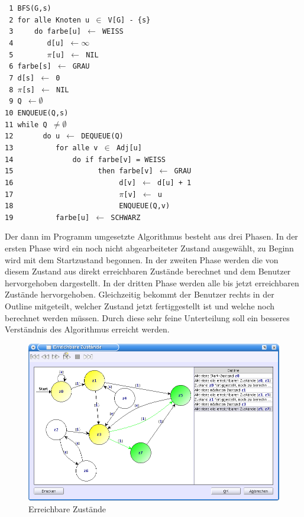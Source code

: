 \noindent
\verb| 1 BFS(G,s)|\\
\verb| 2 for alle Knoten u |$\in$\verb| V[G] - {s}|\\
\verb| 3     do farbe[u] |$\gets$\verb| WEISS|\\
\verb| 4        d[u] |$\gets \infty$\\
\verb| 5        |$\pi$\verb|[u] |$\gets$\verb| NIL|\\
\verb| 6 farbe[s] |$\gets$\verb| GRAU|\\
\verb| 7 d[s] |$\gets$\verb| 0|\\
\verb| 8 |$\pi$\verb|[s] |$\gets$\verb| NIL|\\
\verb| 9 Q |$\gets \emptyset$\\
\verb|10 ENQUEUE(Q,s)|\\
\verb|11 while Q |$\neq \emptyset$\\
\verb|12       do u |$\gets$\verb| DEQUEUE(Q)|\\
\verb|13          for alle v |$\in$\verb| Adj[u]|\\
\verb|14              do if farbe[v] = WEISS|\\
\verb|15                    then farbe[v] |$\gets$\verb| GRAU|\\
\verb|16                         d[v] |$\gets$\verb| d[u] + 1|\\
\verb|17                         |$\pi$\verb|[v] |$\gets$\verb| u|\\
\verb|18                         ENQUEUE(Q,v)|\\
\verb|19          farbe[u] |$\gets$\verb| SCHWARZ|\\
\vspace{10pt}

Der dann im Programm umgesetzte Algorithmus besteht aus drei Phasen. In der
ersten Phase wird ein noch nicht abgearbeiteter Zustand ausgewählt, zu Beginn
wird mit dem Startzustand begonnen. In der zweiten Phase werden die von diesem
Zustand aus direkt erreichbaren Zustände berechnet und dem Benutzer hervorgehoben
dargestellt. In der dritten Phase werden alle bis jetzt erreichbaren Zustände
hervorgehoben. Gleichzeitig bekommt der Benutzer rechts in der Outline
mitgeteilt, welcher Zustand jetzt fertiggestellt ist und welche noch berechnet
werden müssen. Durch diese sehr feine Unterteilung soll ein besseres Verständnis
des Algorithmus erreicht werden.\vspace{10pt}

\begin{figure}[h!]
\begin{center}
\includegraphics[width=12cm]{../images/reachable_states.png}
\caption{Erreichbare Zustände}
\end{center}
\end{figure}
\vspace{10pt}
